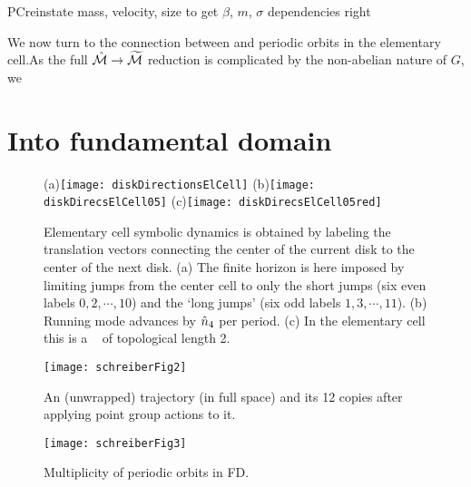 \documentclass[aps,pre,preprint,groupedaddress, floatfix]{revtex4-1}
\begin{document}
PC{reinstate mass, velocity, size to get $\beta$, $m$, $\sigma$
    dependencies right}

We now turn to the connection between  and periodic
orbits in the elementary cell.As the full $\hat {{\cal M}} \rightarrow {\widetilde
{\ensuremath{{\cal M}}}}$ reduction is complicated by the non-abelian nature of $G$, we


\section{Into fundamental domain}
\label{s-SymmetryReduction}

\begin{figure}
\begin{center}
(a)\texttt{[image: diskDirectionsElCell]}
(b)\texttt{[image: diskDirecsElCell05]}
(c)\texttt{[image: diskDirecsElCell05red]}
\end{center}
\caption{
Elementary cell symbolic dynamics is obtained by labeling the translation
vectors connecting the center of the current disk to the center of the
next disk.
(a) The finite horizon is here imposed by limiting jumps from the
center cell to only the short jumps (six even labels $0, 2,\cdots,10$)
and the `long jumps' (six odd labels $1, 3,\cdots,11$).
(b) Running mode  advances by $\hat n_4$ per period.
(c) In the elementary cell this is a \po\ 
    of topological length 2.
    }
\label{diskDirectionsElCell}
\end{figure}


\begin{figure}[htbp]
\begin{center}
\texttt{[image: schreiberFig2]}
\end{center}
\caption[]{ \label{fig:schrieberFig2}
An (unwrapped) trajectory (in full space) and its 12 copies after
applying point group actions to it.}
\end{figure}

\begin{figure}[htbp]
\begin{center}
\texttt{[image: schreiberFig3]}
\caption[]{Multiplicity of periodic orbits in FD. \label{fig:schrieberFig3}}
\end{center}

\end{figure}
\end{document}
